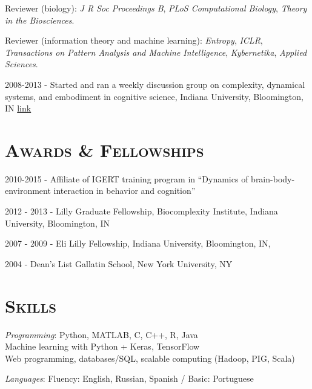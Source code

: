 \documentclass[margin,line,centered]{res}
\begin{document}
\begin{resume}
Reviewer (biology): \emph{J R Soc Proceedings B}, \emph{PLoS Computational Biology}, \emph{Theory in the Biosciences}.

Reviewer (information theory and machine learning): \emph{Entropy}, \emph{ICLR}, \emph{Transactions on Pattern Analysis and Machine Intelligence}, \emph{Kybernetika}, \emph{Applied Sciences}.

2008-2013 - Started and ran a weekly discussion group on complexity, dynamical systems, and embodiment in cognitive science, Indiana University, Bloomington, IN \href{http://apophenia.wikidot.com/}{link}

\section{\textsc{Awards \& Fellowships}}
2010-2015 - Affiliate of IGERT training program in ``Dynamics of brain-body-environment interaction in behavior and cognition'' 

2012 - 2013 - Lilly Graduate Fellowship, Biocomplexity Institute, Indiana University, Bloomington, IN

2007 - 2009 - Eli Lilly Fellowship, Indiana University, Bloomington, IN, 

2004 - Dean's List Gallatin School, New York University, NY


\section{\textsc{Skills}}



\hangindent=10pt \emph{Programming}: Python, MATLAB, C, C++, R, Java \\
Machine learning with Python + Keras, TensorFlow\\
Web programming, databases/SQL, scalable computing (Hadoop, PIG, Scala)

\emph{Languages}: Fluency: English, Russian, Spanish / Basic: Portuguese

\end{resume}
\end{document}
